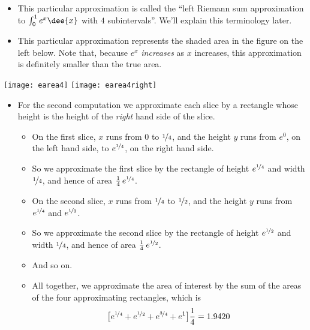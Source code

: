 \begin{eg}
\begin{itemize}
\begin{itemize}
\item This particular approximation is called the ``left Riemann sum
approximation to $\int_0^1 e^x\dee{x}$ with $4$ subintervals''. We'll explain this
terminology later.

\item This particular approximation represents the shaded area
in the figure on the left below. Note that, because $e^x$ \emph{increases} as
$x$ increases, this approximation is definitely smaller than the true area.
\end{itemize}
\end{itemize}

\begin{efig}
\begin{center}
  \texttt{[image: earea4]}\qquad
  \texttt{[image: earea4right]}
\end{center}
\end{efig}

\begin{itemize}
\item For the second computation we approximate each slice by a rectangle
whose height is the height of the \emph{right} hand side of the slice.
\begin{itemize}
\item On the first slice, $x$ runs from $0$ to $\nicefrac{1}{4}$,
and the height $y$ runs from $e^0$, on the left hand side, to
$e^{\nicefrac{1}{4}}$, on the right hand side.

\item So we approximate the first slice by the rectangle of height
$e^{\nicefrac{1}{4}}$ and width $\nicefrac{1}{4}$, and hence of area
$\frac{1}{4}\,e^{\nicefrac{1}{4}}$.

\item On the second slice, $x$ runs from $\nicefrac{1}{4}$ to
$\nicefrac{1}{2}$, and the height $y$ runs from $e^{\nicefrac{1}{4}}$ and
$e^{\nicefrac{1}{2}}$.

\item So we approximate the second slice by the rectangle of height
$e^{\nicefrac{1}{2}}$ and width $\nicefrac{1}{4}$, and hence of area
$\frac{1}{4}\,e^{\nicefrac{1}{2}}$.

\item And so on.

\item All together, we approximate the area of interest by the sum
of the areas of the four approximating rectangles, which is
\begin{align*}
\big[e^{\nicefrac{1}{4}} + e^{\nicefrac{1}{2}}
      +e^{\nicefrac{3}{4}}+e^1\big]\frac{1}{4}
=1.9420
\end{align*}


\end{itemize}
\end{itemize}
\end{eg}
